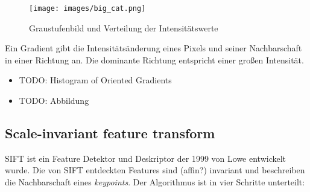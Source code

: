 \begin{figure}
	\centering
	\texttt{[image: images/big\_cat.png]}
	\caption{Graustufenbild und Verteilung der Intensitätswerte}
	\label{img:hist}
\end{figure}

Ein Gradient gibt die Intensitätsänderung eines Pixels und seiner Nachbarschaft in einer Richtung an. Die dominante Richtung entspricht einer großen Intensität. 

\begin{itemize}
	\item TODO: Histogram of Oriented Gradients
 	\item TODO: Abbildung
\end{itemize}

\subsection{Scale-invariant feature transform}

SIFT ist ein Feature Detektor und Deskriptor der 1999 von Lowe entwickelt wurde. Die von SIFT entdeckten Features sind (affin?) invariant und beschreiben die Nachbarschaft eines \textit{keypoints}. Der Algorithmus ist in vier Schritte unterteilt:

